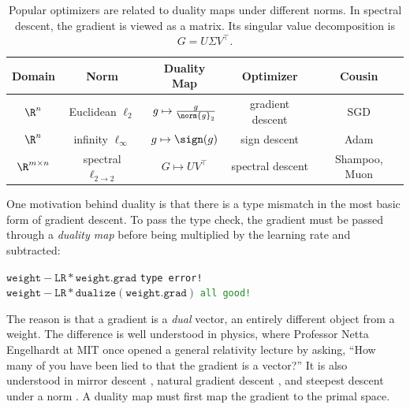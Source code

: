 \renewcommand{\arraystretch}{1.5}
\begin{table}[t]
    \centering
    \begin{tabular}{ccccc}
        \toprule
        \textbf{Domain} & \textbf{Norm} & \hspace{1.3em}\textbf{Duality Map} & \textbf{Optimizer} & \textbf{Cousin}\\
        \midrule
        $\R^n$ & Euclidean $\ell_2$ & $\displaystyle g \mapsto  \tfrac{g}{\norm{g}_2}$ & gradient descent & SGD \\
        
        $\R^n$ & infinity $\ell_\infty$ & $\displaystyle g \mapsto \sign(g)$ & sign descent & Adam \\
        
        $\R^{m\times n}$ & spectral $\ell_{2\to2}$ & $\displaystyle G \mapsto UV^\top$ & spectral descent & Shampoo, Muon \\
        \bottomrule
    \end{tabular}
    \caption{Popular optimizers are related to duality maps under different norms. In spectral descent, the gradient is viewed as a matrix. Its singular value decomposition is $G = U \Sigma V^\top$.}
    \label{tab:weight_update_rules}
\end{table}
\renewcommand{\arraystretch}{1}

One motivation behind duality is that there is a type mismatch in the most basic form of gradient descent. To pass the type check, the gradient must be passed through a \textit{duality map} before being multiplied by the learning rate and subtracted:

\begin{center}
    \begin{minipage}{0.6\textwidth}
    $\mathtt{weight} - \mathtt{LR}\,\mathtt{*}\,\mathtt{weight.grad}$ \hfill \texttt{\textcolor{BrickRed}{type error!}} \\
    $\mathtt{weight} - \mathtt{LR}\,\mathtt{*}\,\mathtt{dualize}(\mathtt{weight.grad})$ \hfill \texttt{\textcolor{ForestGreen}{all good!}}
    \end{minipage}
\end{center}

The reason is that a gradient is a \textit{dual} vector, an entirely different object from a weight. The difference is well understood in physics, where Professor Netta Engelhardt at MIT once opened a general relativity lecture by asking, ``How many of you have been lied to that the gradient is a vector?'' It is also understood in mirror descent \citep{nemirovsky_yudin_1983}, natural gradient descent \citep{amari2016information}, and steepest descent under a norm \citep{boyd2004convex}. A duality map must first map the gradient to the primal space.

